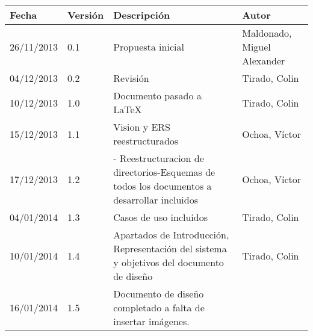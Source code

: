 \begin{tabular}{|p{3cm}|p{1.5cm}|p{3.5cm}|p{4cm}|}
    \hline
    \textbf{Fecha} & \textbf{Versión} & \textbf{Descripción} & \textbf{Autor} \\
    \hline
    26/11/2013 & 0.1 & Propuesta inicial & Maldonado, Miguel Alexander \\
    \hline
    04/12/2013 & 0.2 & Revisión & Tirado, Colin \\
    \hline
    10/12/2013 & 1.0 & Documento pasado a LaTeX & Tirado, Colin \\
    \hline
    15/12/2013 & 1.1 & Vision y ERS reestructurados & Ochoa, Víctor \\
    \hline
    17/12/2013 & 1.2 & - Reestructuracion de directorios\newline -Esquemas de todos los documentos a desarrollar incluidos & Ochoa, Víctor \\
    04/01/2014 & 1.3 & Casos de uso incluidos & Tirado, Colin \\
    \hline
    10/01/2014 & 1.4 & Apartados de Introducci\'on, Representaci\'on del sistema y objetivos del documento de dise\~no & Tirado, Colin \\
    \hline
    16/01/2014 & 1.5 & Documento de dise\~no completado a falta de insertar im\'agenes. \\
    \hline
\end{tabular}
